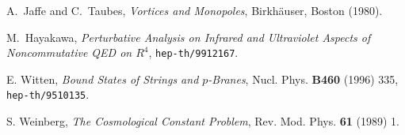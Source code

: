 \documentclass[a4paper,12pt]{article}
\begin{document}
\begin{thebibliography}{10}
 A.~Jaf\mbox{}fe and C.~Taubes, \textit{Vortices and Monopoles},
             Birkh\"auser, Boston (1980). 

 M.~Hayakawa, \textit{Perturbative Analysis on Infrared and
             Ultraviolet Aspects of Noncommutative QED on $R^4$},
             \texttt{hep-th/9912167}.

 E. Witten, \textit{Bound States of Strings and $p$-Branes},
             Nucl. Phys. {\bf B460} (1996) 335, \texttt{hep-th/9510135}.

 S. Weinberg, \textit{The Cosmological Constant Problem},
             Rev. Mod. Phys. {\bf 61} (1989) 1.

\end{thebibliography}
\end{document}
